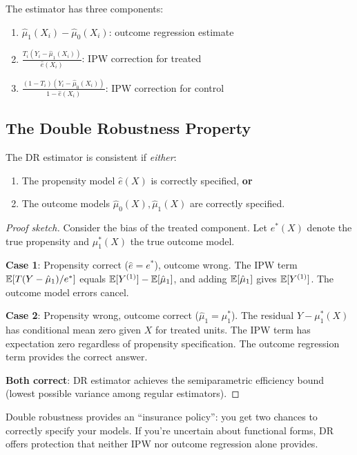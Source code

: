 The estimator has three components:
\begin{enumerate}
    \item $\hat{\mu}_1(X_i) - \hat{\mu}_0(X_i)$: outcome regression estimate
    \item $\frac{T_i(Y_i - \hat{\mu}_1(X_i))}{\hat{e}(X_i)}$: IPW correction for treated
    \item $\frac{(1-T_i)(Y_i - \hat{\mu}_0(X_i))}{1 - \hat{e}(X_i)}$: IPW correction for control
\end{enumerate}

\subsection{The Double Robustness Property}

\begin{theorem}
\label{thm:double_robust}
The DR estimator is consistent if \emph{either}:
\begin{enumerate}
    \item The propensity model $\hat{e}(X)$ is correctly specified, \textbf{or}
    \item The outcome models $\hat{\mu}_0(X), \hat{\mu}_1(X)$ are correctly specified.
\end{enumerate}
\end{theorem}

\begin{proof}[Proof sketch]
Consider the bias of the treated component. Let $e^*(X)$ denote the true propensity and $\mu_1^*(X)$ the true outcome model.

\textbf{Case 1}: Propensity correct ($\hat{e} = e^*$), outcome wrong.
The IPW term $\mathbb{E}[T(Y - \hat{\mu}_1)/e^*]$ equals $\mathbb{E}[Y^{(1)}] - \mathbb{E}[\hat{\mu}_1]$, and adding $\mathbb{E}[\hat{\mu}_1]$ gives $\mathbb{E}[Y^{(1)}]$. The outcome model errors cancel.

\textbf{Case 2}: Propensity wrong, outcome correct ($\hat{\mu}_1 = \mu_1^*$).
The residual $Y - \mu_1^*(X)$ has conditional mean zero given $X$ for treated units. The IPW term has expectation zero regardless of propensity specification. The outcome regression term provides the correct answer.

\textbf{Both correct}: DR estimator achieves the semiparametric efficiency bound (lowest possible variance among regular estimators).
\end{proof}

\begin{insight}
Double robustness provides an ``insurance policy'': you get two chances to correctly specify your models. If you're uncertain about functional forms, DR offers protection that neither IPW nor outcome regression alone provides.
\end{insight}

